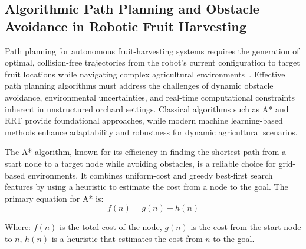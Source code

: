 \documentclass{ieeeaccess}
\begin{document}
\subsection{Algorithmic Path Planning and Obstacle Avoidance in Robotic Fruit Harvesting}
Path planning for autonomous fruit-harvesting systems requires the generation of optimal, collision-free trajectories from the robot's current configuration to target fruit locations while navigating complex agricultural environments~\cite{Leong:2024_review}. Effective path planning algorithms must address the challenges of dynamic obstacle avoidance, environmental uncertainties, and real-time computational constraints inherent in unstructured orchard settings. Classical algorithms such as A* and RRT provide foundational approaches, while modern machine learning-based methods enhance adaptability and robustness for dynamic agricultural scenarios.

The A* algorithm, known for its efficiency in finding the shortest path from a start node to a target node while avoiding obstacles, is a reliable choice for grid-based environments. It combines uniform-cost and greedy best-first search features by using a heuristic to estimate the cost from a node to the goal. The primary equation for A* is:
\begin{equation}
f(n) = g(n) + h(n)
\label{eq:astar}
\end{equation}

Where:
$f(n)$ is the total cost of the node, 
$g(n)$ is the cost from the start node to $n$, 
$h(n)$ is a heuristic that estimates the cost from $n$ to the goal.
\end{document}

